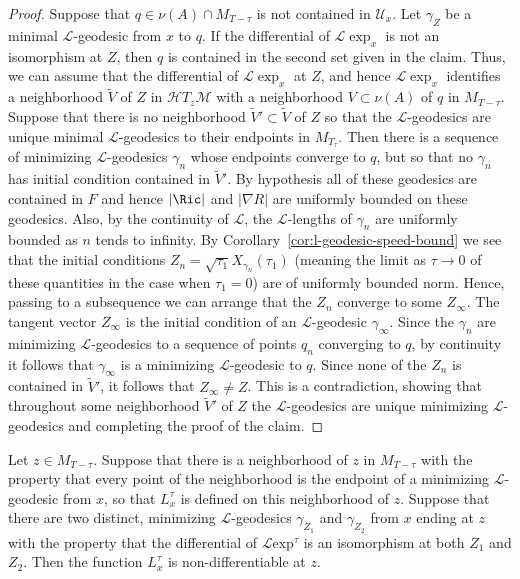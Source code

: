 \begin{proof}
\sketch
Suppose that $q\in \nu(A)\cap M_{T-\tau}$ is not contained in ${\mathcal U}_x$.
Let $\gamma_Z$ be a minimal ${\mathcal L}$-geodesic  from $x$ to $q$. If the
differential of ${\mathcal L}\exp_x$ is not an isomorphism at $Z$, then
$q$ is contained in the second set given in the claim. Thus, we can assume that
the differential of ${\mathcal L}\exp_x$ at $Z$, and hence ${\mathcal
L}\exp_x$ identifies a neighborhood $\widetilde V$ of $Z$ in ${\mathcal
H}T_z{\mathcal M}$ with a neighborhood $V\subset \nu(A)$  of $q$ in
$M_{T-\tau}$. Suppose that there is no neighborhood $\widetilde V'\subset
\widetilde V$ of $Z$ so that the ${\mathcal L}$-geodesics are unique minimal
${\mathcal L}$-geodesics to their endpoints in $M_{T_\tau}$. Then there is a
sequence of minimizing ${\mathcal L}$-geodesics $\gamma_n$ whose endpoints
converge to $q$, but so that no $\gamma_n$ has initial condition contained in
$\widetilde V'$. By hypothesis all of these geodesics are contained in $F$ and
hence $|\Ric|$ and $|\nabla R|$ are uniformly bounded on these geodesics.
Also,  by the continuity of ${\mathcal L}$, the ${\mathcal L}$-lengths of
$\gamma_n$ are uniformly bounded as $n$ tends to infinity. By
Corollary~\ref{cor:l-geodesic-speed-bound} we see that the initial conditions
$Z_n=\sqrt{\tau_1}X_{\gamma_n}(\tau_1)$ (meaning the limit as $\tau\rightarrow
0$ of these quantities in the case when $\tau_1=0$) are of uniformly bounded
norm. Hence, passing to a subsequence we can arrange that the $Z_n$ converge to
some $Z_\infty$. The tangent vector $Z_\infty$ is the initial condition of an
${\mathcal L}$-geodesic $\gamma_\infty$. Since the $\gamma_n$ are minimizing
${\mathcal L}$-geodesics to a sequence of points $q_n$ converging to $q$, by
continuity it follows that $\gamma_\infty$ is a minimizing ${\mathcal
L}$-geodesic to $q$. Since none of the $Z_n$ is contained in $\widetilde V'$,
it follows that $Z_\infty\not= Z$. This is a contradiction, showing that
throughout some neighborhood $\widetilde V'$ of $Z$ the ${\mathcal
L}$-geodesics are unique minimizing ${\mathcal L}$-geodesics and completing the
proof of the claim.
\end{proof}

\begin{claim}\label{claim:l-length-nondifferentiable-at-multiple-geodesics}
Let $z\in M_{T-\tau}$. Suppose that there is a neighborhood of $z$ in
$M_{T-\tau}$ with the property that every point of the neighborhood is the
endpoint of a minimizing ${\mathcal L}$-geodesic from $x$, so that $L^\tau_x$
is defined on this neighborhood of $z$. Suppose that there are two distinct,
minimizing ${\mathcal L}$-geodesics $\gamma_{Z_1}$ and $\gamma_{Z_2}$ from $x$
ending at $z$ with the property that the differential of ${\mathcal L}\mathrm{exp}^{\tau}$ is an isomorphism at both $Z_1$ and $Z_2$. Then the function
$L^\tau_x$ is non-differentiable at $z$.
\end{claim}

